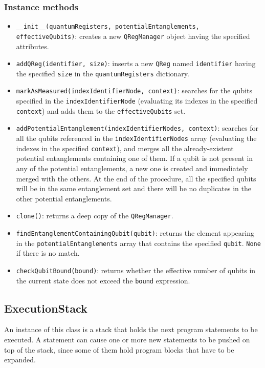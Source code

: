 \documentclass[12pt,a4paper]{report}
\theoremstyle{definition}
\theoremstyle{definition}
\theoremstyle{definition}
\begin{document}
\subsubsection{Instance methods}
\begin{itemize}
    \itemsep 0em
    \item \texttt{\_\_init\_\_(quantumRegisters, potentialEntanglements, effectiveQubits)}: creates a new \texttt{QRegManager} object having the specified attributes.
    \item \texttt{addQReg(identifier, size)}: inserts a new \texttt{QReg} named \texttt{identifier} having the specified \texttt{size} in the \texttt{quantumRegisters} dictionary.
    \item \texttt{markAsMeasured(indexIdentifierNode, context)}: searches for the qubits specified in the \texttt{indexIdentifierNode} (evaluating its indexes in the specified \texttt{context}) and adds them to the \texttt{effectiveQubits} set.
    \item \texttt{addPotentialEntanglement(indexIdentifierNodes, context)}: searches for all the qubits referenced in the \texttt{indexIdentifierNodes} array (evaluating the indexes in the specified \texttt{context}), and merges all the already-existent potential entanglements containing one of them. If a qubit is not present in any of the potential entanglements, a new one is created and immediately merged with the others. At the end of the procedure, all the specified qubits will be in the same entanglement set and there will be no duplicates in the other potential entanglements.
    \item \texttt{clone()}: returns a deep copy of the \texttt{QRegManager}.
    \item \texttt{findEntanglementContainingQubit(qubit)}: returns the element appearing in the \texttt{potentialEntanglements} array that contains the specified \texttt{qubit}. \texttt{None} if there is no match.
    \item \texttt{checkQubitBound(bound)}: returns whether the effective number of qubits in the current state does not exceed the \texttt{bound} expression.
\end{itemize}

\subsection{ExecutionStack}
An instance of this class is a stack that holds the next program statements to be executed. A statement can cause one or more new statements to be pushed on top of the stack, since some of them hold program blocks that have to be expanded.
\end{document}
